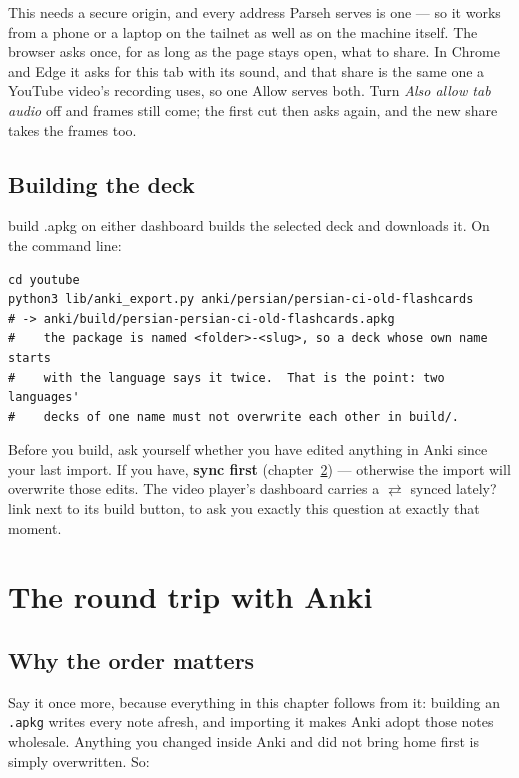 \documentclass[11pt,oneside]{report}
\newcommand{\file}[1]{\texttt{#1}}
\newcommand{\menu}[1]{\textsf{#1}}
\begin{document}
This needs a secure origin, and every address Parseh serves is one --- so
it works from a phone or a laptop on the tailnet as well as on the machine
itself. The browser asks once, for as long as the page stays open, what to
share. In Chrome and Edge it asks for this tab with its sound, and that
share is the same one a YouTube video's recording uses, so one
\menu{Allow} serves both. Turn \emph{Also allow tab audio} off and frames
still come; the first cut then asks again, and the new share takes the
frames too.

\section{Building the deck}

\menu{build .apkg} on either dashboard builds the selected deck and
downloads it. On the command line:

\begin{lstlisting}
cd youtube
python3 lib/anki_export.py anki/persian/persian-ci-old-flashcards
# -> anki/build/persian-persian-ci-old-flashcards.apkg
#    the package is named <folder>-<slug>, so a deck whose own name starts
#    with the language says it twice.  That is the point: two languages'
#    decks of one name must not overwrite each other in build/.
\end{lstlisting}

\begin{warnbox}
Before you build, ask yourself whether you have edited anything in Anki
since your last import. If you have, \textbf{sync first}
(chapter~\ref{ch:roundtrip}) --- otherwise the import will overwrite those
edits. The video player's dashboard carries a
\menu{\(\rightleftarrows\) synced lately?} link next to its build button, to
ask you exactly this question at exactly that moment.
\end{warnbox}

\chapter{The round trip with Anki}
\label{ch:roundtrip}

\section{Why the order matters}

Say it once more, because everything in this chapter follows from it:
building an \file{.apkg} writes every note afresh, and importing it makes
Anki adopt those notes wholesale. Anything you changed inside Anki and did
not bring home first is simply overwritten. So:
\end{document}
